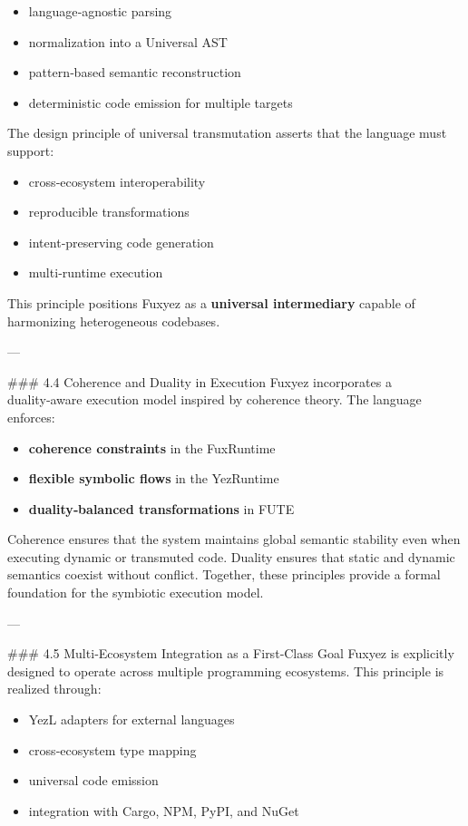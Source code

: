 \begin{itemize}
  \item language‑agnostic parsing  
  \item normalization into a Universal AST  
  \item pattern‑based semantic reconstruction  
  \item deterministic code emission for multiple targets  
\end{itemize}

The design principle of universal transmutation asserts that the language must support:

\begin{itemize}
  \item cross‑ecosystem interoperability  
  \item reproducible transformations  
  \item intent‑preserving code generation  
  \item multi‑runtime execution  
\end{itemize}

This principle positions Fuxyez as a \textbf{universal intermediary} capable of harmonizing heterogeneous codebases.

---

\#\#\# 4.4 Coherence and Duality in Execution  
Fuxyez incorporates a duality‑aware execution model inspired by coherence theory. The language enforces:

\begin{itemize}
  \item \textbf{coherence constraints} in the FuxRuntime  
  \item \textbf{flexible symbolic flows} in the YezRuntime  
  \item \textbf{duality‑balanced transformations} in FUTE  
\end{itemize}

Coherence ensures that the system maintains global semantic stability even when executing dynamic or transmuted code. Duality ensures that static and dynamic semantics coexist without conflict. Together, these principles provide a formal foundation for the symbiotic execution model.

---

\#\#\# 4.5 Multi‑Ecosystem Integration as a First‑Class Goal  
Fuxyez is explicitly designed to operate across multiple programming ecosystems. This principle is realized through:

\begin{itemize}
  \item YezL adapters for external languages  
  \item cross‑ecosystem type mapping  
  \item universal code emission  
  \item integration with Cargo, NPM, PyPI, and NuGet  
\end{itemize}

